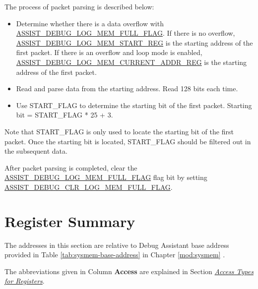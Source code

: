 \documentclass[main\_\_EN.tex]{subfiles}
\begin{document}
The process of packet parsing is described below:

\begin{itemize}
    \item Determine whether there is a data overflow with \hyperref[fielddesc:ASSISTDEBUGLOGMEMFULLFLAG]{ASSIST\_DEBUG\_LOG\_MEM\_FULL\_FLAG}. If there is no overflow, \hyperref[regdesc:ASSISTDEBUGLOGMEMSTARTREG]{ASSIST\_DEBUG\_LOG\_MEM\_START\_REG} is the starting address of the first packet. If there is an overflow and loop mode is enabled, \hyperref[regdesc:ASSISTDEBUGLOGMEMCURRENTADDRREG]{ASSIST\_DEBUG\_LOG\_MEM\_CURRENT\_ADDR\_REG} is the starting address of the first packet.
    
    \item Read and parse data from the starting address. Read 128 bits each time.
    
    \item Use START\_FLAG to determine the starting bit of the first packet. Starting bit = START\_FLAG * 25 + 3.
\end{itemize}

Note that START\_FLAG is only used to locate the starting bit of the first packet. Once the starting bit is located, START\_FLAG should be filtered out in the subsequent data.

After packet parsing is completed, clear the \hyperref[fielddesc:ASSISTDEBUGLOGMEMFULLFLAG]{ASSIST\_DEBUG\_LOG\_MEM\_FULL\_FLAG} flag bit by setting\\ \hyperref[fielddesc:ASSISTDEBUGCLRLOGMEMFULLFLAG]{ASSIST\_DEBUG\_CLR\_LOG\_MEM\_FULL\_FLAG}.




\clearpage
\section{Register Summary}
\label{sec:dbgassist-reg-summ}
\hypertarget{alias-reg-summ}{}

The addresses in this section are relative to Debug Assistant base address provided in Table \ref{tab:sysmem-base-address} in Chapter \ref{mod:sysmem} \textit{}.

The abbreviations given in Column \textbf{Access} are explained in Section \hyperref[glossary-access-types]{\textit{Access Types for Registers}}.
\end{document}
